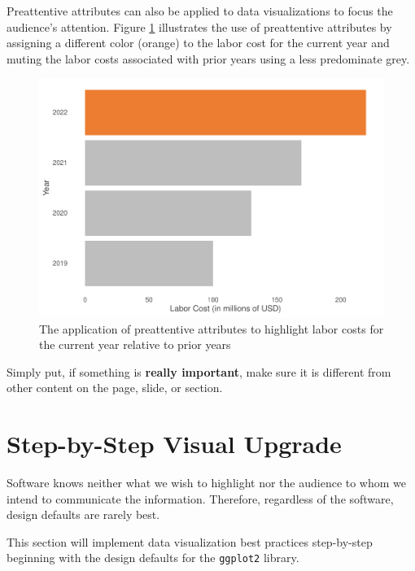 \documentclass[
]{book}
\begin{document}
Preattentive attributes can also be applied to data visualizations to focus the audience's attention. Figure \ref{fig:pre-attr-2} illustrates the use of preattentive attributes by assigning a different color (orange) to the labor cost for the current year and muting the labor costs associated with prior years using a less predominate grey.

\begin{figure}

{\centering \includegraphics[width=1\linewidth]{The_Fundamentals_of_People_Analytics_files/figure-latex/pre-attr-2-1} 

}

\caption{The application of preattentive attributes to highlight labor costs for the current year relative to prior years}\label{fig:pre-attr-2}
\end{figure}

Simply put, if something is \textbf{really important}, make sure it is different from other content on the page, slide, or section.

\hypertarget{step-by-step-visual-upgrade}{%
\section{Step-by-Step Visual Upgrade}\label{step-by-step-visual-upgrade}}

Software knows neither what we wish to highlight nor the audience to whom we intend to communicate the information. Therefore, regardless of the software, design defaults are rarely best.

This section will implement data visualization best practices step-by-step beginning with the design defaults for the \texttt{ggplot2} library.
\end{document}
